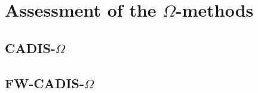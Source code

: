 \section{Assessment of the $\Omega$-methods}
\label{sec:assessments}

\subsection{CADIS-$\Omega$}
\label{subsec:assess-cadom}

\subsection{FW-CADIS-$\Omega$}
\label{subsec:assess-fwcadom}


